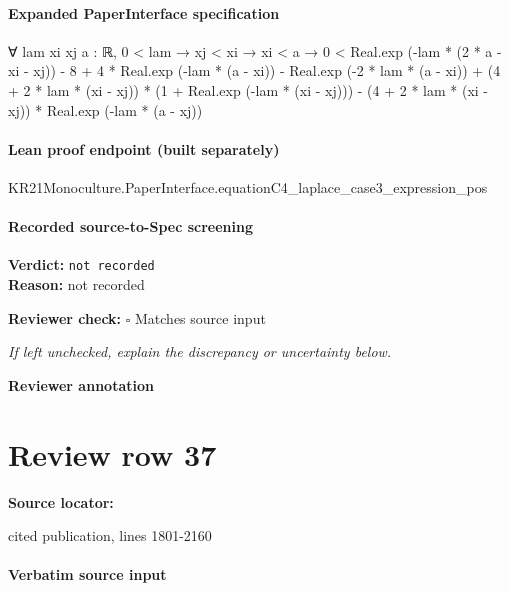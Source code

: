 \documentclass[10pt]{article}
\newcommand{\reviewerbox}{%
  \par\noindent\fbox{\parbox{0.96\linewidth}{\rule{0pt}{0.38in}}}\par
}
\newcommand{\reviewmatch}[1]{%
  \par\noindent\textbf{Reviewer check:} $\square$\; #1\par
  \noindent\emph{If left unchecked, explain the discrepancy or uncertainty below.}\par
}
\begin{document}
\paragraph{Expanded PaperInterface specification}
\begin{ReviewVerbatim}
∀ {lam xi xj a : ℝ},
  0 < lam →
    xj < xi →
      xi < a →
        0 <
          Real.exp (-lam * (2 * a - xi - xj)) - 8 + 4 * Real.exp (-lam * (a - xi)) - Real.exp (-2 * lam * (a - xi)) +
              (4 + 2 * lam * (xi - xj)) * (1 + Real.exp (-lam * (xi - xj))) -
            (4 + 2 * lam * (xi - xj)) * Real.exp (-lam * (a - xj))
\end{ReviewVerbatim}

\paragraph{Lean proof endpoint (built separately)}\begin{ReviewVerbatim}
KR21Monoculture.PaperInterface.equationC4_laplace_case3_expression_pos
\end{ReviewVerbatim}

\paragraph{Recorded source-to-Spec screening}
\textbf{Verdict:} \texttt{not recorded}
\\
\textbf{Reason:} not recorded
\reviewmatch{Matches source input}
\noindent\textbf{Reviewer annotation}\par
\reviewerbox
\clearpage
\hypertarget{source-claim-33bdbb546218e99a}{}
\section*{Review row 37}
\textbf{Source locator:} {\footnotesize\raggedright cited publication, lines 1801-\allowbreak{}2160\par}
\paragraph{Verbatim source input}
\begin{ReviewVerbatim}
\end{ReviewVerbatim}
\end{document}
